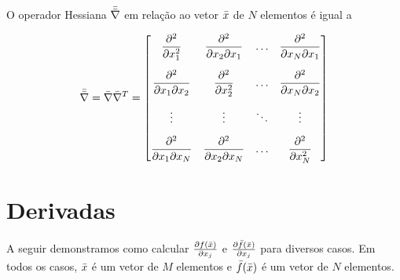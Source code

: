 \begin{define}
    O operador Hessiana $\bar{\bar{\nabla}}$ em relação ao vetor $\bar{x}$ de $N$
    elementos é igual a

    \begin{equation}
    \mat{\nabla} = \vect{\nabla}\vect{\nabla}^T =
    \begin{bmatrix}
    \dfrac{\partial^2}{\partial x_1^2} &
    \dfrac{\partial^2}{\partial x_2 \partial x_1} &
    \ldots &
    \dfrac{\partial^2}{\partial x_N \partial x_1}
    \vspace{0.3cm}\\
    \dfrac{\partial^2}{\partial x_1 \partial x_2} &
    \dfrac{\partial^2}{\partial x_2^2} &
    \ldots &
    \dfrac{\partial^2}{\partial x_N \partial x_2}
    \vspace{0.3cm}\\
    \vdots & \vdots & \ddots & \vdots
    \vspace{0.3cm}\\
    \dfrac{\partial^2}{\partial x_1 \partial x_N} &
    \dfrac{\partial^2}{\partial x_2 \partial x_N} &
    \ldots &
    \dfrac{\partial^2}{\partial x_N^2}
    \end{bmatrix}
    \label{eq:ophess}
    \end{equation}
\end{define}

\section{Derivadas}

A seguir demonstramos como calcular $\frac{\partial f(\bar{x})}{\partial x_j}$
e $\frac{\partial \bar{f}(\bar{x})}{\partial x_j}$ para diversos casos.
Em todos os casos, $\bar{x}$ é um vetor de $M$ elementos e $\bar{f}(\bar{x})$
é um vetor de $N$ elementos.

